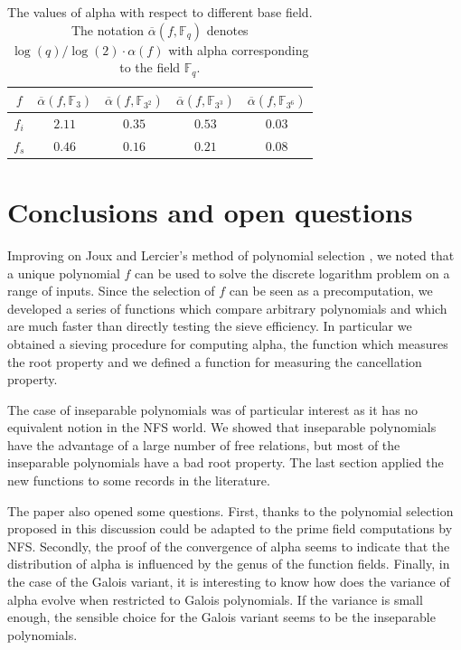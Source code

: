 \documentclass[a4wide]{article}
\newcommand{\F}{{\mathbb F}}
\theoremstyle{plain}
\theoremstyle{definition}
\theoremstyle{remark}
\begin{document}
\begin{table}
	\begin{center}
		\begin{tabular}{|c|cccc|}
		\hline
		$f$ &  $\overline{\alpha}(f,\F_3)$  &
                $\overline{\alpha}(f,\F_{3^2})$ &
	       $\overline{\alpha}(f, \F_{3^3})$  &
		$\overline{\alpha}(f,\F_{3^6})$ \\  
		\hline
		$f_i$ & $2.11$  & $0.35$   & $0.53$  & $0.03$  \\
		$f_s$ & $0.46$  & $0.16$   & $0.21$  & $0.08$  \\  
		\hline
	\end{tabular}
\end{center}
	\caption{The values of alpha with respect to different base field.
	The notation $\overline{\alpha}(f,\F_q)$ denotes
$\log(q)/\log(2)\cdot \alpha(f)$ with alpha corresponding to the field
$\F_q$.}
\label{tab:normalized_alpha}
\end{table}


\section{Conclusions and open questions}\label{conclusion}
Improving on Joux and Lercier's method of polynomial selection \cite{JoLe02}, we noted
that a unique polynomial $f$ can be used to solve the discrete logarithm
problem on a range of inputs. Since the selection of $f$ can be seen as a
precomputation, we developed a series of functions which compare arbitrary
polynomials and which are much faster than directly testing the sieve
efficiency. In particular we obtained a sieving procedure for computing
alpha, the function which measures the root property and we defined a
function for measuring the cancellation property.

The case of inseparable polynomials was of particular interest as it has no equivalent notion in the NFS
world. We showed that inseparable polynomials have the advantage of a large
number of free relations, but most of the inseparable polynomials have a bad
root property. The last section applied the new functions to some records in the
literature. 

The paper also opened some questions. First, thanks to the polynomial selection proposed in
\cite{JoLe03} this discussion could be adapted to the prime field
computations by NFS. Secondly, the proof of the convergence of alpha seems
to indicate that the distribution of alpha is influenced by the genus of the
function fields. Finally, in the case of the Galois variant, it is
interesting to know how does the variance of alpha evolve when restricted to
Galois polynomials. If the variance is small enough, the sensible choice for the
Galois variant seems to be the inseparable polynomials.
\end{document}
